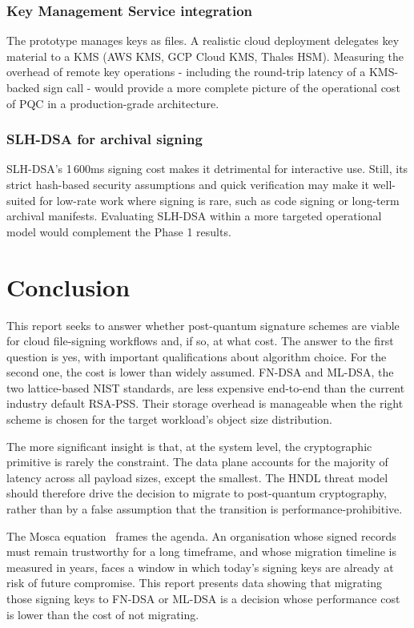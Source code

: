 \documentclass[12pt,a4paper]{article}
\begin{document}
\subsubsection{Key Management Service integration} The prototype manages keys as files. A realistic cloud deployment delegates key material to a KMS (AWS KMS, GCP Cloud KMS, Thales HSM). Measuring the overhead of remote key operations - including the round-trip latency of a KMS-backed sign call - would provide a more complete picture of the operational cost of PQC in a production-grade architecture.

\subsubsection{SLH-DSA for archival signing} SLH-DSA's 1\,600ms signing cost makes it detrimental for interactive use. Still, its strict hash-based security assumptions and quick verification may make it well-suited for low-rate work where signing is rare, such as code signing or long-term archival manifests. Evaluating SLH-DSA within a more targeted operational model would complement the Phase 1 results.

\newpage
\section{Conclusion}
\label{sec:conclusion}

This report seeks to answer whether post-quantum signature schemes are viable for cloud file-signing workflows and, if so, at what cost. The answer to the first question is yes, with important qualifications about algorithm choice. For the second one, the cost is lower than widely assumed. FN-DSA and ML-DSA, the two lattice-based NIST standards, are less expensive end-to-end than the current industry default RSA-PSS. Their storage overhead is manageable when the right scheme is chosen for the target workload's object size distribution.

The more significant insight is that, at the system level, the cryptographic primitive is rarely the constraint. The data plane accounts for the majority of latency across all payload sizes, except the smallest. The HNDL threat model should therefore drive the decision to migrate to post-quantum cryptography, rather than by a false assumption that the transition is performance-prohibitive.

The Mosca equation~\cite{mosca2018} frames the agenda. An organisation whose signed records must remain trustworthy for a long timeframe, and whose migration timeline is measured in years, faces a window in which today's signing keys are already at risk of future compromise. This report presents data showing that migrating those signing keys to FN-DSA or ML-DSA is a decision whose performance cost is lower than the cost of not migrating.
\end{document}
